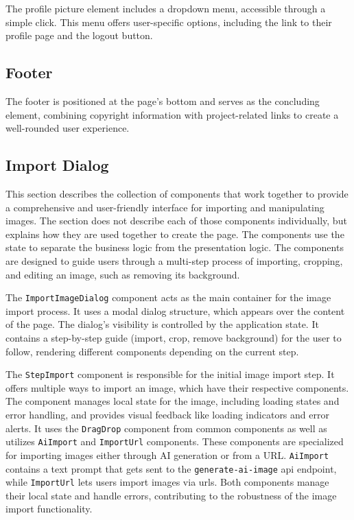 The profile picture element includes a dropdown menu, accessible through a simple click. This menu offers user-specific options, including the link to their profile page and the logout button.

\subsection{Footer}

The footer is  positioned at the page's bottom and serves as the concluding element, combining copyright information with project-related links to create a well-rounded user experience.

\subsection{Import Dialog}

This section describes the collection of components that work together to provide a comprehensive and user-friendly interface for importing and manipulating images. The section does not describe each of those components individually, but explains how they are used together to create the page. The components use the state to separate the business logic from the presentation logic. The components are designed to guide users through a multi-step process of importing, cropping, and editing an image, such as removing its background.

The \texttt{ImportImageDialog} component acts as the main container for the image import process. It uses a modal dialog structure, which appears over the content of the page. The dialog's visibility is controlled by the application state. It contains a step-by-step guide (import, crop, remove background) for the user to follow, rendering different components depending on the current step.

The \texttt{StepImport} component is responsible for the initial image import step. It offers multiple ways to import an image, which have their respective components. The component manages local state for the image, including loading states and error handling, and provides visual feedback like loading indicators and error alerts. It uses the \texttt{DragDrop} component from common components as well as utilizes \texttt{AiImport} and \texttt{ImportUrl} components. These components are specialized for importing images either through AI generation or from a URL. \texttt{AiImport} contains a text prompt that gets sent to the \texttt{generate-ai-image} \acrshort{api} endpoint, while \texttt{ImportUrl} lets users import images via \acrshort{url}s. Both components manage their local state and handle errors, contributing to the robustness of the image import functionality.

